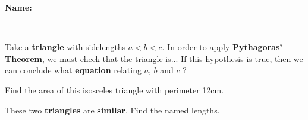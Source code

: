 \documentclass[12pt]{exam}
\begin{document}
\textbf{Name:} \dotfill

\
\begin{questions}


\question[2] Take a \textbf{triangle} with sidelengths $a < b < c$. In order to apply \textbf{Pythagoras' Theorem}, we must check that the triangle is...
\fillwithdottedlines{7mm}
If this hypothesis is true, then we can conclude what \textbf{equation} relating $a$, $b$ and $c$ ?
\fillwithdottedlines{7mm}

\question[4] Find the area of this isosceles triangle with perimeter 12cm.
\vspace{-5mm}

\begin{minipage}{0.8\textwidth}
\vspace{3mm}
\fillwithdottedlines{55mm}
\end{minipage}
\begin{minipage}{0.2\textwidth}
\begin{center}




\end{center}
\end{minipage}

\question[3] These two \textbf{triangles} are \textbf{similar}. Find the named lengths.
\vspace{-3mm}

\begin{center}
\hspace{10mm}
\end{center}
\vspace{-4mm}
\fillwithdottedlines{21mm}



\end{questions}
\end{document}
